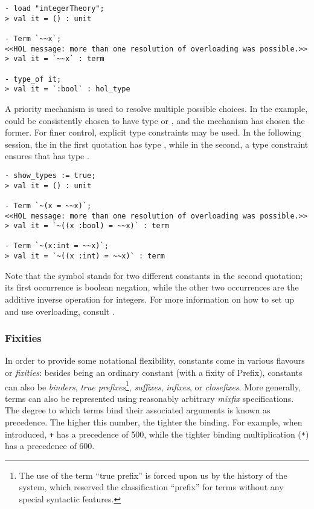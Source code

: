 {\setcounter{sessioncount}{1}
\begin{session}
\begin{verbatim}
- load "integerTheory";
> val it = () : unit

- Term `~~x`;
<<HOL message: more than one resolution of overloading was possible.>>
> val it = `~~x` : term

- type_of it;
> val it = `:bool` : hol_type
\end{verbatim}
\end{session}

A priority mechanism is used to resolve multiple possible choices. In
the example, \holtxt{\~{}} could be consistently chosen to have type
 or , and the
mechanism has chosen the former. For finer control, explicit type
constraints may be used. In the following session, the
 in the first quotation has type ,
while in the second, a type constraint ensures that  has
type .

\begin{session}
\begin{verbatim}
- show_types := true;
> val it = () : unit

- Term `~(x = ~~x)`;
<<HOL message: more than one resolution of overloading was possible.>>
> val it = `~((x :bool) = ~~x)` : term

- Term `~(x:int = ~~x)`;
> val it = `~((x :int) = ~~x)` : term
\end{verbatim}
\end{session}

Note that the symbol \holtxt{\~{}} stands for two different constants in
the second quotation; its first occurrence is boolean negation, while
the other two occurrences are the additive inverse operation for integers.
For more information on how to set up and use overloading, consult
\REFERENCE.

\subsubsection{Fixities}

In order to provide some notational flexibility, constants come in
various flavours or {\it fixities}: besides being an ordinary constant
(with a fixity of {\sf Prefix}), constants can also be {\it binders},
{\it true prefixes}\footnote{The use of the term ``true prefix'' is
forced upon us by the history of the system, which reserved the
classification ``prefix'' for terms without any special syntactic
features.}, {\it suffixes}, {\it infixes}, or {\it closefixes}.  More
generally, terms can also be represented using reasonably arbitrary
{\it mixfix} specifications.  The degree to which terms bind their
associated arguments is known as precedence.  The higher this number,
the tighter the binding.  For example, when introduced, \verb-+- has a
precedence of 500, while the tighter binding multiplication (\verb+*+)
has a precedence of 600.

}
